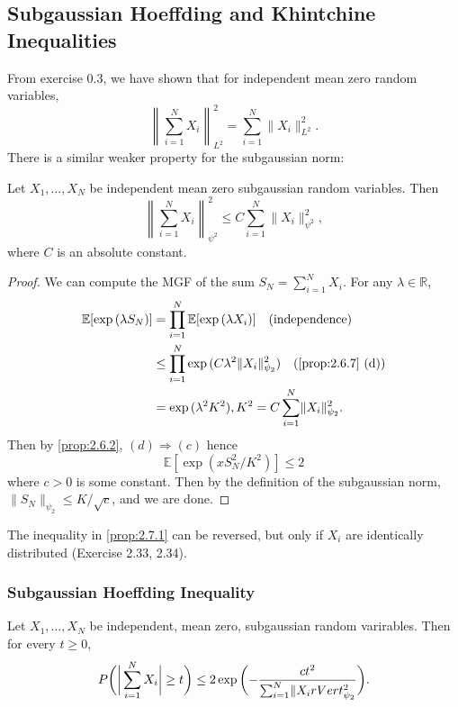 \subsection{Subgaussian Hoeffding and Khintchine Inequalities}
From exercise 0.3, we have shown that for independent mean zero random variables, 
\[ \left\lVert \sum_{i = 1}^{N} X_i \right\lVert_{L^2}^2 = \sum_{i = 1}^{N} \lVert X_i \rVert_{L^2}^2. \]
There is a similar weaker property for the subgaussian norm: 

\begin{proposition}
\label{prop:2.7.1}
Let $X_1, \dots, X_N$ be independent mean zero subgaussian random variables. Then 
\[ \left\lVert \sum_{i = 1}^{N} X_i \right\lVert_{\psi^2}^2 \leq C\sum_{i = 1}^{N} 
\lVert X_i \rVert_{\psi^2}^2, \]
where $C$ is an absolute constant.
\end{proposition}

\begin{proof}
We can compute the MGF of the sum $S_N = \sum_{i = 1}^{N} X_i$. For any $\lambda \in \mathbb{R}$, 
\begin{align*}
	\mathbb{E}[\exp{(\lambda S_N)}] 
	&= \prod_{i = 1}^{N} \mathbb{E}[\exp{(\lambda X_i)}] \quad \text{(independence)} \\
	&\leq \prod_{i = 1}^{N} \exp{(C \lambda^2 \lVert X_i \rVert_{\psi_2}^2)} 
	\quad \text{(\cref{prop:2.6.7} (d))} \\
	&= \exp{(\lambda^2 K^2)}, K^2 = C \sum_{i = 1}^{N} \lVert X_i \rVert_{\psi_2}^2.
\end{align*}
Then by \cref{prop:2.6.2}, $(d) \Rightarrow (c)$ hence 
\[ \mathbb{E}[\exp{(x S_N^2 / K^2)}] \leq 2 \]
where $c > 0$ is some constant. Then by the definition of the subgaussian norm, $\lVert S_N \rVert_{\psi_2} 
\leq K / \sqrt{c}$, and we are done.
\end{proof}

\begin{remark}
\label{rmk:2.7.2}
The inequality in \cref{prop:2.7.1} can be reversed, but only if $X_i$ are identically distributed 
(Exercise 2.33, 2.34).
\end{remark}


\subsubsection{Subgaussian Hoeffding Inequality}
\begin{theorem}
\label{thm:2.7.3}
Let $X_1, \dots, X_N$ be independent, mean zero, subgaussian random varirables. Then for every $t \geq 0$, 
\[ P \biggl( \bigg| \sum_{i = 1}^{N} X_i \bigg| \geq t \biggr) 
\leq 2\exp{\biggl( -\frac{ct^2}{\sum_{i = 1}^{N} \lVert X_i \\rVert_{\psi_2}^2} \biggr)}. \]
\end{theorem}

